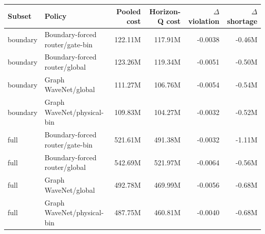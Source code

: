 \begin{tabular}{llrrrr}
\toprule
Subset & Policy & Pooled cost & Horizon-Q cost & $\Delta$ violation & $\Delta$ shortage \\
\midrule
boundary & Boundary-forced router/gate-bin & 122.11M & 117.91M & -0.0038 & -0.46M \\
boundary & Boundary-forced router/global & 123.26M & 119.34M & -0.0051 & -0.50M \\
boundary & Graph WaveNet/global & 111.27M & 106.76M & -0.0054 & -0.54M \\
boundary & Graph WaveNet/physical-bin & 109.83M & 104.27M & -0.0032 & -0.52M \\
full & Boundary-forced router/gate-bin & 521.61M & 491.38M & -0.0032 & -1.11M \\
full & Boundary-forced router/global & 542.69M & 521.97M & -0.0064 & -0.56M \\
full & Graph WaveNet/global & 492.78M & 469.99M & -0.0056 & -0.68M \\
full & Graph WaveNet/physical-bin & 487.75M & 460.81M & -0.0040 & -0.68M \\
\bottomrule
\end{tabular}
